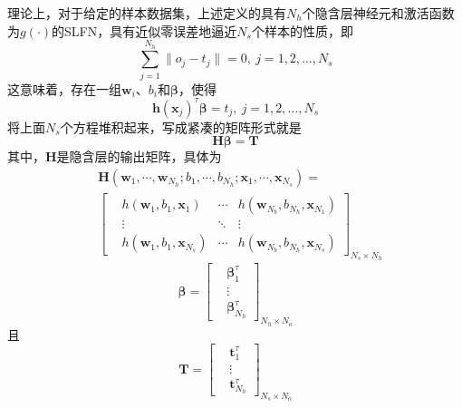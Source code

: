 理论上，对于给定的样本数据集，上述定义的具有$N_{h}$个隐含层神经元和激活函数为$g(\cdot)$的SLFN，具有近似零误差地逼近$N_{s}$个样本的性质，即
\begin{equation*}
\sum_{j=1}^{N_{h}}\|o_{j}-t_{j}\|=0,\ j=1,2,\dots,N_{s}
\end{equation*}
这意味着，存在一组$\bm{w}_{i}$、$b_{i}$和$\bm{\beta}$，使得
\begin{equation}
\bm{h}(\bm{x}_{j})^{\tau}\bm{\beta}=t_{j},\ j=1,2,\dots,N_{s}
\end{equation}
将上面$N_{s}$个方程堆积起来，写成紧凑的矩阵形式就是
\begin{equation}\label{eq:4.nn.HT}
\bm{H}\bm{\beta}=\bm{T}
\end{equation}
其中，$\bm{H}$是隐含层的输出矩阵，具体为
\begin{equation}\label{eq:4.nn.H}
\begin{split}
&\bm{H}(\bm{w}_{1},\cdots,\bm{w}_{N_{h}};b_{1},\cdots,b_{N_{h}};\bm{x}_{1},\cdots,\bm{x}_{N_{s}})=\\
&\begin{bmatrix}
&h(\bm{w}_{1},b_{1},\bm{x}_{1}) &\cdots &h(\bm{w}_{N_{b}},b_{N_{h}},\bm{x}_{N_{1}})\\
&\vdots &\ddots & \vdots\\
&h(\bm{w}_{1},b_{1},\bm{x}_{N_{s}}) &\cdots &h(\bm{w}_{N_{b}},b_{N_{h}},\bm{x}_{N_{s}})
\end{bmatrix}_{N_{s}\times N_{h}}
\end{split}
\end{equation}
\begin{equation}\label{eq:4.nn.beta}
\bm{\beta} = \begin{bmatrix}%
&\bm{\beta}_{1}^{\tau}\\
&\vdots\\
&\bm{\beta}_{N_{h}}^{\tau}
\end{bmatrix}_{N_{h}\times N_{o}}
\end{equation}
且
\begin{equation}\label{eq:4.nn.T}
\bm{T} = \begin{bmatrix}%
&\bm{t}_{1}^{\tau}\\
&\vdots\\
&\bm{t}_{N_{h}}^{\tau}
\end{bmatrix}_{N_{s}\times N_{o}}
\end{equation}

